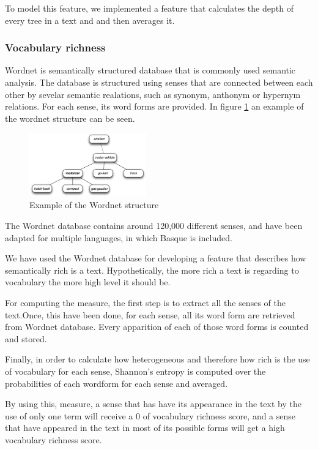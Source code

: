 \documentclass{acm_proc_article-sp}
\begin{document}
To model this feature, we implemented a feature that calculates the depth of every tree in a text and and then averages it. 



\subsubsection{Vocabulary richness}
Wordnet \cite{miller1995wordnet}  is semantically structured database that is commonly used semantic analysis. The database is structured using senses that are connected between each other by sevelar semantic realations, such as synonym, anthonym or hypernym relations. For each sense, its word forms are provided. In figure \ref{wordnetHierarchy} an example of the wordnet structure can be seen. 

\begin{figure}[h]

\centering
\includegraphics[width=0.45\textwidth]{wordnetHierarchy}
\caption{Example of the Wordnet structure}
\label{wordnetHierarchy}
\end{figure}

The Wordnet database contains around 120,000 different senses, and have been adapted \cite{agirre2002methodological} for multiple languages, in which Basque is included.

We have used the Wordnet database for developing a feature that describes how semantically rich is a text. Hypothetically, the more rich a text is regarding to vocabulary the more high level it should be.

For computing the measure, the first step is to extract all the senses of the text.Once, this have been done, for each sense, all its word form are retrieved from Wordnet database. Every apparition of each of those word forms is counted and stored.


Finally, in order to calculate how heterogeneous and therefore how rich is the use of vocabulary for each sense, Shannon's entropy \cite{shannon2001mathematical} is computed over the probabilities of each wordform for each sense and averaged.

By using this, measure, a sense that has have its appearance in the text by the use of only one term will receive a 0 of vocabulary richness score, and a sense that have appeared in the text in most of its possible forms will get a high vocabulary richness score.
\end{document}

